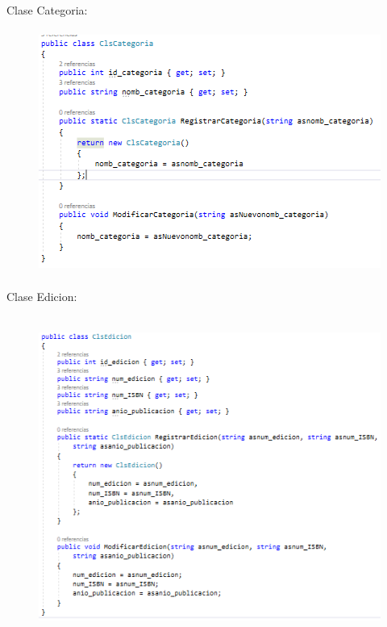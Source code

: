 \documentclass[12pt]{article}
\begin{document}
\begin{enumerate}[label*=\arabic*.]
\begin{enumerate}[label*=\arabic*.]
\newpage
Clase Categoria:
\begin{figure}[H]
	\begin{Center}
		\includegraphics[width=4.91in,height=3.15in]{./media/2.png}
	\end{Center}
\end{figure}


Clase Edicion:
\begin{figure}[H]
	\begin{Center}
		\includegraphics[width=4.91in,height=4.15in]{./media/3.png}
	\end{Center}
\end{figure}


\end{enumerate}
\end{enumerate}
\end{document}
